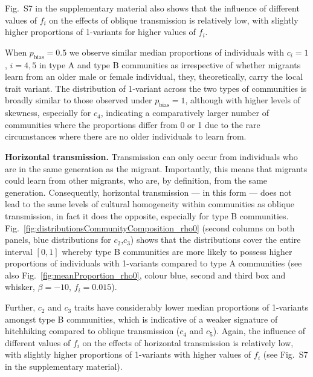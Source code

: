 \documentclass[9pt,twocolumn,twoside,lineno]{pnas-new}
\begin{document}
Fig.~S7 in the supplementary material also shows that the influence of different values of $f_i$ on the effects of oblique transmission is relatively low, with slightly higher proportions of 1-variants for higher values of $f_i$. 

When $p_\text{bias}=0.5$ we observe similar median proportions of individuals with $c_i=1$, $i=4,5$ in type A and type B communities as irrespective of whether migrants learn from an older male or female individual, they, theoretically, carry the local trait variant. The distribution of 1-variant across the two types of communities is broadly similar to those observed under $p_\text{bias}=1$, although with higher levels of skewness, especially for $c_4$, indicating a comparatively larger number of communities where the proportions differ from 0 or 1 due to the rare circumstances where there are no older individuals to learn from.

{\bf Horizontal transmission.} Transmission can only occur from individuals who are in the same generation as the migrant. 
Importantly, this means that migrants could learn from other migrants, who are, by definition, from the same generation. Consequently, horizontal transmission --- in this form --- does not lead to the same levels of cultural homogeneity within communities as oblique transmission, in fact it does the opposite, especially for type B communities. 
Fig.~\ref{fig:distributionsCommunityComposition_rho0} (second columns on both panels, blue distributions for $c_2$,$c_3$) shows that the distributions cover the entire interval $[0,1]$ whereby type B communities are more likely to possess higher proportions of individuals with 1-variants compared to type A communities (see also Fig.~\ref{fig:meanProportion_rho0}, colour blue, second and third box and whisker, $\beta=-10$, $f_i=0.015$).  

Further, $c_2$ and $c_3$ traits have considerably lower median proportions of 1-variants amongst type B communities, which is indicative of a weaker signature of hitchhiking compared to oblique transmission ($c_4$ and $c_5$). Again, the influence of different values of $f_i$ on the effects of horizontal transmission is relatively low, with slightly higher proportions of 1-variants with higher values of $f_i$ (see Fig.~S7 in the supplementary material).
\end{document}
